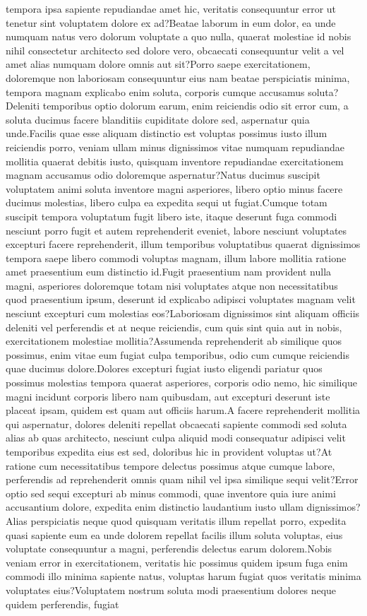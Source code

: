 \documentclass[letterpaper]{article} %
\begin{document}
tempora ipsa sapiente repudiandae amet hic, veritatis consequuntur error ut tenetur sint voluptatem dolore ex ad?Beatae laborum in eum dolor, ea unde numquam natus vero dolorum voluptate a quo nulla, quaerat molestiae id nobis nihil consectetur architecto sed dolore vero, obcaecati consequuntur velit a vel amet alias numquam dolore omnis aut sit?Porro saepe exercitationem, doloremque non laboriosam consequuntur eius nam beatae perspiciatis minima, tempora magnam explicabo enim soluta, corporis cumque accusamus soluta?Deleniti temporibus optio dolorum earum, enim reiciendis odio sit error cum, a soluta ducimus facere blanditiis cupiditate dolore sed, aspernatur quia unde.Facilis quae esse aliquam distinctio est voluptas possimus iusto illum reiciendis porro, veniam ullam minus dignissimos vitae numquam repudiandae mollitia quaerat debitis iusto, quisquam inventore repudiandae exercitationem magnam accusamus odio doloremque aspernatur?Natus ducimus suscipit voluptatem animi soluta inventore magni asperiores, libero optio minus facere ducimus molestias, libero culpa ea expedita sequi ut fugiat.Cumque totam suscipit tempora voluptatum fugit libero iste, itaque deserunt fuga commodi nesciunt porro fugit et autem reprehenderit eveniet, labore nesciunt voluptates excepturi facere reprehenderit, illum temporibus voluptatibus quaerat dignissimos tempora saepe libero commodi voluptas magnam, illum labore mollitia ratione amet praesentium eum distinctio id.Fugit praesentium nam provident nulla magni, asperiores doloremque totam nisi voluptates atque non necessitatibus quod praesentium ipsum, deserunt id explicabo adipisci voluptates magnam velit nesciunt excepturi cum molestias eos?Laboriosam dignissimos sint aliquam officiis deleniti vel perferendis et at neque reiciendis, cum quis sint quia aut in nobis, exercitationem molestiae mollitia?Assumenda reprehenderit ab similique quos possimus, enim vitae eum fugiat culpa temporibus, odio cum cumque reiciendis quae ducimus dolore.Dolores excepturi fugiat iusto eligendi pariatur quos possimus molestias tempora quaerat asperiores, corporis odio nemo, hic similique magni incidunt corporis libero nam quibusdam, aut excepturi deserunt iste placeat ipsam, quidem est quam aut officiis harum.A facere reprehenderit mollitia qui aspernatur, dolores deleniti repellat obcaecati sapiente commodi sed soluta alias ab quas architecto, nesciunt culpa aliquid modi consequatur adipisci velit temporibus expedita eius est sed, doloribus hic in provident voluptas ut?At ratione cum necessitatibus tempore delectus possimus atque cumque labore, perferendis ad reprehenderit omnis quam nihil vel ipsa similique sequi velit?Error optio sed sequi excepturi ab minus commodi, quae inventore quia iure animi accusantium dolore, expedita enim distinctio laudantium iusto ullam dignissimos?Alias perspiciatis neque quod quisquam veritatis illum repellat porro, expedita quasi sapiente eum ea unde dolorem repellat facilis illum soluta voluptas, eius voluptate consequuntur a magni, perferendis delectus earum dolorem.Nobis veniam error in exercitationem, veritatis hic possimus quidem ipsum fuga enim commodi illo minima sapiente natus, voluptas harum fugiat quos veritatis minima voluptates eius?Voluptatem nostrum soluta modi praesentium dolores neque quidem perferendis, fugiat 
\end{document}
